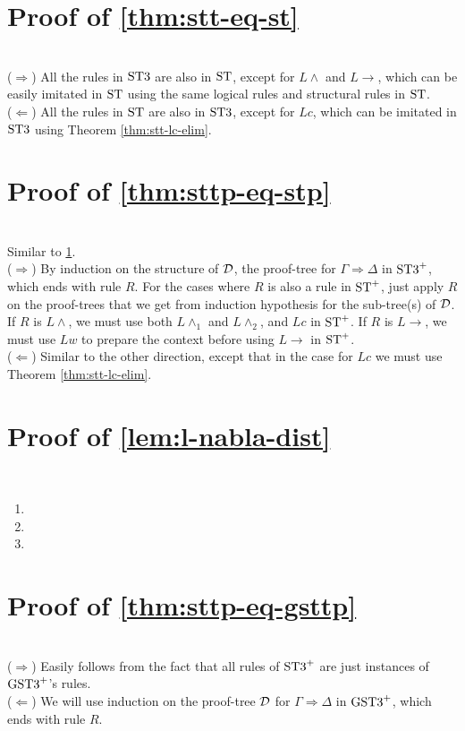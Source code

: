 \documentclass[a4paper, 12pt]{paper}
\begin{document}
\section{Proof of \ref{thm:stt-eq-st}}\label{pr:stt-eq-st}\quad \\
($\Rightarrow$) All the rules in $\text{ST3}$ are also in $\text{ST}$, except for $L \wedge$ and $L \rightarrow$, which can be easily imitated in $\text{ST}$ using the same logical rules and structural rules in $\text{ST}$. \\
($\Leftarrow$) All the rules in $\text{ST}$ are also in $\text{ST3}$, except for $Lc$, which can be imitated in $\text{ST3}$ using Theorem \ref{thm:stt-lc-elim}.



\section{Proof of \ref{thm:sttp-eq-stp}}\label{pr:sttp-eq-stp}\quad \\
Similar to \ref{pr:stt-eq-st}.\\
($\Rightarrow$) By induction on the structure of $\mathcal{D}$, the proof-tree for $\Gamma \Rightarrow \Delta$ in $\text{ST3}^+$, which ends with rule $R$.
For the cases where $R$ is also a rule in $\text{ST}^+$, just apply $R$ on the proof-trees that we get from induction hypothesis for the sub-tree(s) of $\mathcal{D}$. If $R$ is $L \wedge$, we must use both $L \wedge_1$ and $L \wedge_2$, and $Lc$ in $\text{ST}^+$. If $R$ is $L \rightarrow$, we must use $Lw$ to prepare the context before using $L \rightarrow$ in $\text{ST}^+$.\\
($\Leftarrow$) Similar to the other direction, except that in the case for $Lc$ we must use Theorem \ref{thm:stt-lc-elim}.


\section{Proof of \ref{lem:l-nabla-dist}}\label{pr:l-nabla-dist}\quad \\
\begin{enumerate}
  \item \quad 
  \item \quad 
  \item \quad 
\end{enumerate}



\section{Proof of \ref{thm:sttp-eq-gsttp}}\label{pr:sttp-eq-gsttp}\quad \\
($\Rightarrow$) Easily follows from the fact that all rules of $\text{ST3}^+$ are just instances of $\text{GST3}^+$'s rules.\\
($\Leftarrow$) We will use induction on the proof-tree $\mathcal{D}$ for $\Gamma \Rightarrow \Delta$ in $\text{GST3}^+$, which ends with rule $R$.
\end{document}
